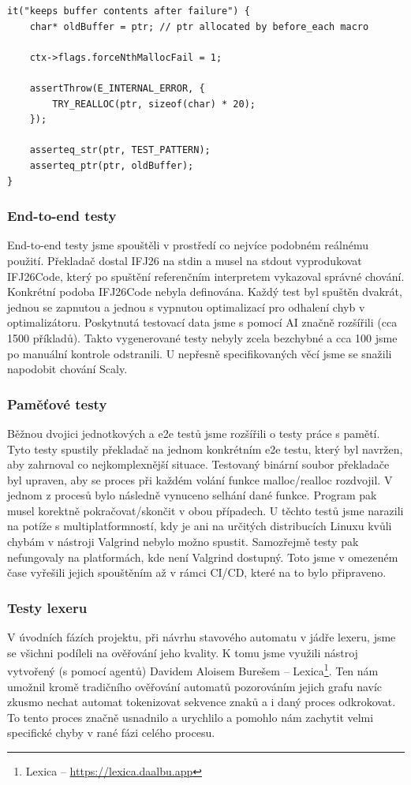 \documentclass[11pt,a4paper]{article}
\begin{document}
\begin{lstlisting}[style=cstyle]
it("keeps buffer contents after failure") {
    char* oldBuffer = ptr; // ptr allocated by before_each macro

    ctx->flags.forceNthMallocFail = 1;

    assertThrow(E_INTERNAL_ERROR, {
        TRY_REALLOC(ptr, sizeof(char) * 20);
    });

    asserteq_str(ptr, TEST_PATTERN);
    asserteq_ptr(ptr, oldBuffer);
}
\end{lstlisting}

\subsubsection{End-to-end testy}
End-to-end testy jsme spouštěli v prostředí co nejvíce podobném reálnému použití. Překladač dostal IFJ26 na stdin a musel na stdout vyprodukovat IFJ26Code, který po spuštění referenčním interpretem vykazoval správné chování. Konkrétní podoba IFJ26Code nebyla definována. Každý test byl spuštěn dvakrát, jednou se zapnutou a jednou s vypnutou optimalizací pro odhalení chyb v optimalizátoru. Poskytnutá testovací data jsme s pomocí AI značně rozšířili (cca 1500 příkladů). Takto vygenerované testy nebyly zcela bezchybné a cca 100 jsme po manuální kontrole odstranili. U nepřesně specifikovaných věcí jsme se snažili napodobit chování Scaly.

\subsubsection{Paměťové testy}
Běžnou dvojici jednotkových a e2e testů jsme rozšířili o testy práce s pamětí. Tyto testy spustily překladač na jednom konkrétním e2e testu, který byl navržen, aby zahrnoval co nejkomplexnější situace. Testovaný binární soubor překladače byl upraven, aby se proces při každém volání funkce malloc/realloc rozdvojil. V jednom z procesů bylo následně vynuceno selhání dané funkce. Program pak musel korektně pokračovat/skončit v obou případech. U těchto testů jsme narazili na potíže s multiplatformností, kdy je ani na určitých distribucích Linuxu kvůli chybám v nástroji Valgrind nebylo možno spustit. Samozřejmě testy pak nefungovaly na platformách, kde není Valgrind dostupný. Toto jsme v omezeném čase vyřešili jejich spouštěním až v rámci CI/CD, které na to bylo připraveno.

\subsubsection{Testy lexeru}
V úvodních fázích projektu, při návrhu stavového automatu v jádře lexeru, jsme se všichni podíleli na ověřování jeho kvality. K tomu jsme využili nástroj vytvořený (s pomocí agentů) Davidem Aloisem Burešem -- Lexica\footnote{Lexica -- \url{https://lexica.daalbu.app}}. Ten nám umožnil kromě tradičního ověřování automatů pozorováním jejich grafu navíc zkusmo nechat automat tokenizovat sekvence znaků a i daný proces odkrokovat. To tento proces značně usnadnilo a urychlilo a pomohlo nám zachytit velmi specifické chyby v rané fázi celého procesu.
\end{document}
